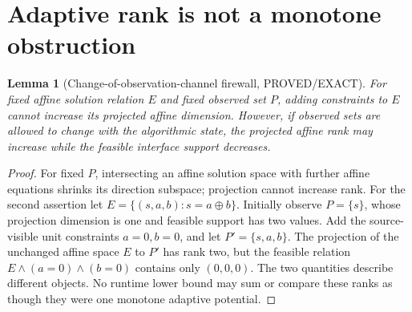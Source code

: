 \documentclass[11pt]{article}
\newtheorem{lemma}[theorem]{Lemma}
\begin{document}
\section{Adaptive rank is not a monotone obstruction}
\begin{lemma}[Change-of-observation-channel firewall, PROVED/EXACT]
For fixed affine solution relation \(E\) and fixed observed set \(P\),
adding constraints to \(E\) cannot increase its projected affine
dimension. However, if observed sets are allowed to change with the
algorithmic state, the projected affine rank may \emph{increase}
while the feasible interface support \emph{decreases}.
\end{lemma}
\begin{proof}
For fixed \(P\), intersecting an affine solution space with further
affine equations shrinks its direction subspace; projection cannot
increase rank. For the second assertion let
\(E=\{(s,a,b):s=a\oplus b\}\). Initially observe \(P=\{s\}\), whose
projection dimension is one and feasible support has two values.
Add the source-visible unit constraints \(a=0,b=0\), and let
\(P'=\{s,a,b\}\). The projection of the unchanged affine
space \(E\) to \(P'\) has rank two, but the feasible relation
\(E\land(a=0)\land(b=0)\) contains only \((0,0,0)\).
The two quantities describe different objects. No runtime lower
bound may sum or compare these ranks as though they were one
monotone adaptive potential.
\end{proof}
\end{document}
